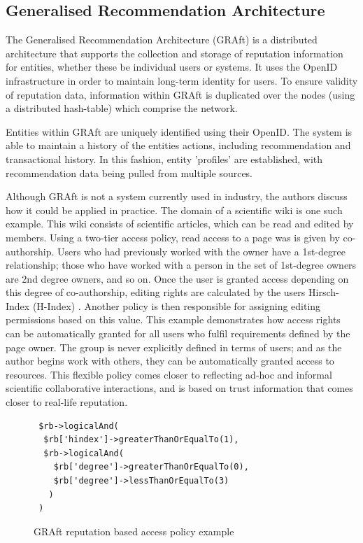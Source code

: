 \subsection{Generalised Recommendation Architecture}

The Generalised Recommendation Architecture (GRAft) \cite{} is a distributed architecture that supports the collection and storage of reputation information for entities, whether these be individual users or systems. It uses the OpenID \cite{} infrastructure in order to maintain long-term identity for users. To ensure validity of reputation data, information within GRAft is duplicated over the nodes (using a distributed hash-table) which comprise the network. 

Entities within GRAft are uniquely identified using their OpenID. The system is able to maintain a history of the entities actions, including recommendation and transactional history. In this fashion, entity 'profiles' are established, with recommendation data being pulled from multiple sources.



Although GRAft is not a system currently used in industry, the authors discuss how it could be applied in practice. The domain of a scientific wiki is one such example. This wiki consists of scientific articles, which can be read and edited by members. Using a two-tier access policy, read access to a page was is given by co-authorship. Users who had previously worked with the owner have a 1st-degree relationship; those who have worked with a person in the set of 1st-degree owners are 2nd degree owners, and so on. Once the user is granted access depending on this degree of co-authorship, editing rights are calculated by the users Hirsch-Index (H-Index) \cite{}. Another policy is then responsible for assigning editing permissions based on this value. This example demonstrates how access rights can be automatically granted for all users who fulfil requirements defined by the page owner. The group is never explicitly defined in terms of users; and as the author begins work with others, they can be 
automatically granted access to resources. This flexible policy comes closer to reflecting ad-hoc and informal scientific collaborative interactions, and is based on trust information that comes closer to real-life reputation. 

\begin{center}
\begin{figure}[h!]
\begin{verbatim}
 $rb->logicalAnd(
  $rb['hindex']->greaterThanOrEqualTo(1),
  $rb->logicalAnd(
    $rb['degree']->greaterThanOrEqualTo(0),
    $rb['degree']->lessThanOrEqualTo(3)
   )
 )
\end{verbatim}
\caption{GRAft reputation based access policy example}
\end{figure}
\end{center}


